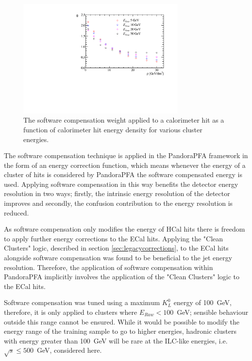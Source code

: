 \begin{figure}[h!]
\includegraphics[width=0.75\textwidth]{EnergyEstimators/Plots/SoftComp/Weights/SoftwareCompensationWeights.pdf}
\caption[The software compensation weight applied to a calorimeter hit as a function of calorimeter hit energy density for various cluster energies.]{The software compensation weight applied to a calorimeter hit as a function of calorimeter hit energy density for various cluster energies.}
\label{fig:softcompweights}
\end{figure}

The software compensation technique is applied in the PandoraPFA framework in the form of an energy correction function, which means whenever the energy of a cluster of hits is considered by PandoraPFA the software compensated energy is used.  Applying software compensation in this way benefits the detector energy resolution in two ways; firstly, the intrinsic energy resolution of the detector improves and secondly, the confusion contribution to the energy resolution is reduced.

As software compensation only modifies the energy of HCal hits there is freedom to apply further energy corrections to the ECal hits.  Applying the "Clean Clusters" logic, described in section \ref{sec:legacycorrections}, to the ECal hits alongside software compensation was found to be beneficial to the jet energy resolution.  Therefore, the application of software compensation within PandoraPFA implicitly involves the application of the "Clean Clusters" logic to the ECal hits.  

Software compensation was tuned using a maximum $K^{0}_{L}$ energy of 100~GeV, therefore, it is only applied to clusters where $E_{Raw} < 100$~GeV; sensible behaviour outside this range cannot be ensured.  While it would be possible to modify the energy range of the training sample to go to higher energies, hadronic clusters with energy greater than 100~GeV will be rare at the ILC-like energies, i.e. $\sqrt{s} \leq 500$~GeV, considered here.

